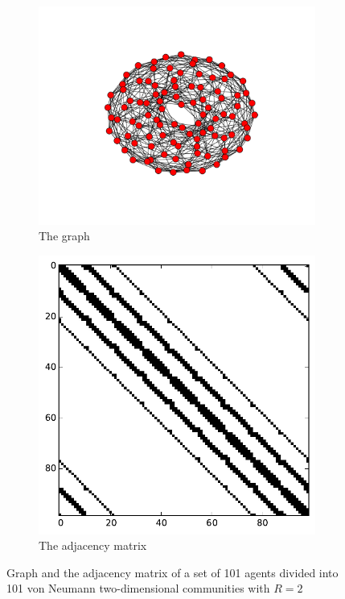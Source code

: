 

\begin{figure}[h]
        \centering
        \begin{subfigure}[b]{0.5\textwidth}
        	\centering
                \includegraphics[width=\textwidth]{images/topology/von_neumann_graph.pdf}
                \caption{The graph}
        \end{subfigure}
        \begin{subfigure}[b]{0.4\textwidth}
        	\centering
                \includegraphics[width=\textwidth]{images/topology/von_neumann_adjacency.pdf}
                \caption{The adjacency matrix}
                \label{subfig:vonNeumann adjacency}
        \end{subfigure}
        \caption{Graph and the adjacency matrix of a set of 101 agents divided into 101 von Neumann two-dimensional communities with $R=2$}
        \label{fig:vonNeumann adjacency graph}
\end{figure}

